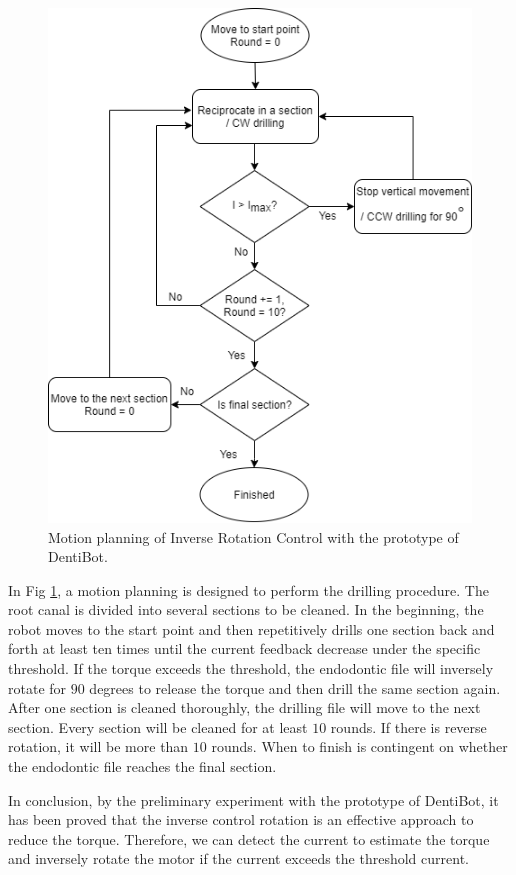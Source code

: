 \begin{figure}[htbp]
\begin{center}
\includegraphics[width=0.5\linewidth]{Images/inverse_rotation.png}
\caption{Motion planning of Inverse Rotation Control with the prototype of DentiBot.}
\label{fig: inverse_rotation} 
\end{center}
\end{figure}
\par
In Fig \ref{fig: inverse_rotation}, a motion planning is designed to perform the drilling procedure. The root canal is divided into several sections to be cleaned. In the beginning, the robot moves to the start point and then repetitively drills one section back and forth at least ten times until the current feedback decrease under the specific threshold. If the torque exceeds the threshold, the endodontic file will inversely rotate for $90$ degrees to release the torque and then drill the same section again. After one section is cleaned thoroughly, the drilling file will move to the next section. Every section will be cleaned for at least $10$ rounds. If there is reverse rotation, it will be more than $10$ rounds. When to finish is contingent on whether the endodontic file reaches the final section.
\par
In conclusion, by the preliminary experiment with the prototype of DentiBot, it has been proved that the inverse control rotation is an effective approach to reduce the torque. Therefore, we can detect the current to estimate the torque and inversely rotate the motor if the current exceeds the threshold current. 
